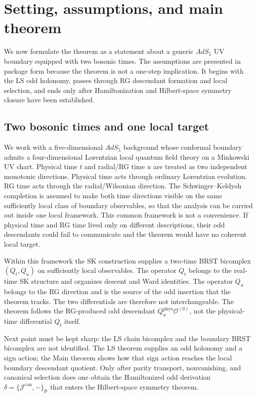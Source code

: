 \documentclass[
  aps,
  prd,
  onecolumn,
  notitlepage,
  nofootinbib,
  superscriptaddress,
  10pt
]{revtex4-2}
\theoremstyle{definition}
\theoremstyle{plain}
\begin{document}
\section{Setting, assumptions, and main theorem}
\label{sec:setup-body}

We now formulate the theorem as a statement about a generic \(AdS_5\) UV
boundary equipped with two bosonic times.  The assumptions are presented in
package form because the theorem is not a one-step implication.  It begins with
the LS odd holonomy, passes through RG descendant formation and local
selection, and ends only after Hamiltonization and Hilbert-space symmetry
closure have been established.

\subsection{Two bosonic times and one local target}
\label{subsec:two-time-arrows}

We work with a five-dimensional \(AdS_5\) background whose conformal boundary
admits a four-dimensional Lorentzian local quantum field theory on a Minkowski
UV chart.  Physical time \(t\) and radial/RG time \(u\) are treated as two
independent monotonic directions.  Physical time acts through ordinary
Lorentzian evolution.  RG time acts through the radial/Wilsonian direction.
The Schwinger--Keldysh completion is assumed to make both time directions visible on the
same sufficiently local class of boundary observables, so that the analysis can
be carried out inside one local framework.  This common framework is not a
convenience.  If physical time and RG time lived only on different
descriptions, their odd descendants could fail to communicate and the theorem
would have no coherent local target.

Within this framework the SK construction supplies a two-time BRST bicomplex
\((Q_t,Q_u)\) on sufficiently local observables.  The operator \(Q_t\) belongs
to the real-time SK structure and organizes descent and Ward identities.  The
operator \(Q_u\) belongs to the RG direction and is the source of the odd
insertion that the theorem tracks.  The two differentials are therefore not
interchangeable.  The theorem follows the RG-produced odd descendant
\(Q_u^{\mathrm{phys}}\mathcal O^{(0)}\), not the physical-time differential
\(Q_t\) itself.

Next point must be kept sharp: the LS chain bicomplex and the boundary BRST
bicomplex are not identified.  The LS theorem supplies an odd holonomy and a
sign action; the Main theorem shows how that sign action reaches the local
boundary descendant quotient.  Only after parity transport, nonvanishing, and
canonical selection does one obtain the Hamiltonized odd derivation
\(
\delta=\{\mathcal J^{\mathrm{can}},-\}_{\mathrm P}
\)
that enters the Hilbert-space symmetry theorem.
\end{document}

